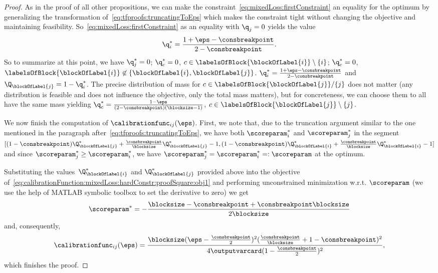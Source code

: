 \documentclass{article}
\begin{document}
\begin{proof}
    As in the proof of all other propositions, we can make the constraint~\eqref{eq:mixedLoss:firstConstraint} an equality for the optimum by generalizing the transformation of~\eqref{eq:tfproofs:truncatingToEps} which makes the constraint tight without changing the objective and maintaining feasibility. So~\eqref{eq:mixedLoss:firstConstraint} as an equality with $\q_j = 0$ yields the value
    $$
    \q_i^* = \frac{1+\eps-\consbreakpoint}{2-\consbreakpoint}.
    $$
    So to summarize at this point, we have $\q_j^* = 0$; $\q_c^* = 0$, $c \in \labelsOfBlock{\blockOfLabel{i}} \setminus \{i\}$; $\q_c^* = 0$, $\labelsOfBlock{\blockOfLabel{i}} \not\in \{\blockOfLabel{i}, \blockOfLabel{j}\}$.  $\q_i^* = \frac{1+\eps-\consbreakpoint}{2-\consbreakpoint}$ and $\Q_{\blockOfLabel{j}}=1-\q_i^*$. The precise distribution of mass for $c \in \labelsOfBlock{\blockOfLabel{j}}/\{j\}$ does not matter (any distribution is feasible and does not influence the objective, only the total mass matters), but for concreteness, we can choose them to all have the same mass yielding $\q_c^* = \frac{1-\eps}{(2-\consbreakpoint)(\blocksize-1)}$, $c \in \labelsOfBlock{\blockOfLabel{j}} \setminus \{j\}$.
    
    We now finish the computation of $\calibrationfunc_{ij}(\eps)$.
    First, we note that, due to the truncation argument similar to the one mentioned in the paragraph after~\eqref{eq:tfproofs:truncatingToEps}, we have  both $\scoreparam_i^*$ and $\scoreparam_j^*$ in the segment $[(1-\consbreakpoint)\Q_{\blockOfLabel{j}}^* + \frac{\consbreakpoint}{\blocksize} \Q_{\blockOfLabel{j}}^*-1, (1-\consbreakpoint)\Q_{\blockOfLabel{i}}^* + \frac{\consbreakpoint}{\blocksize} \Q_{\blockOfLabel{i}}^*-1]$ and since $\scoreparam_j^* \geq \scoreparam_i^*$, we have $\scoreparam_j^* = \scoreparam_i^* =: \scoreparam$ at the optimum.
    
    Substituting the values~$\Q_{\blockOfLabel{i}}^*$ and $\Q_{\blockOfLabel{j}}^*$ provided above into the objective of~\eqref{eq:calibrationFunction:mixedLoss:hardConstr:proofSquare:obj1} and performing unconstrained minimization w.r.t. $\scoreparam$ (we use the help of MATLAB symbolic toolbox to set the derivative to zero) we get
    \[
    \scoreparam^* = -\frac{\blocksize-\consbreakpoint+\consbreakpoint \blocksize}{2\blocksize}
    \]
    and, consequently, 
    \[
    \calibrationfunc_{ij}(\eps) =
    \frac{\blocksize(\eps-\frac{\consbreakpoint}{2})^2(\frac{\consbreakpoint}{\blocksize}+1-\consbreakpoint)^2}{4\outputvarcard(1-\frac{\consbreakpoint}{2})^2},
    \]
    which finishes the proof.
\end{proof}
\end{document}
